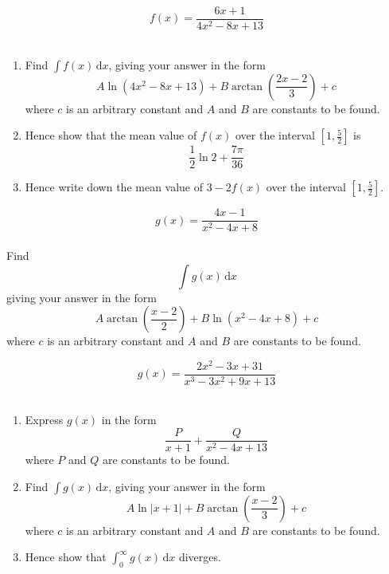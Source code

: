 \documentclass[leqno]{article}
\begin{document}
\begin{enumerate}[
  label=\textbf{\arabic*.},
  leftmargin=*,
  topsep=0pt,
  partopsep=0pt,
  parsep=0pt
]
\newpage

\questionitem

\[f(x)=\frac{6x+1}{4x^2-8x+13}\] \\

\begin{enumerate}[label=\textbf{(\alph*)}]
  \item Find $\int f(x)\,\mathrm{d}x$, giving your answer in the form \[A\ln(4x^2-8x+13)+B\arctan\left(\frac{2x-2}{3}\right)+c\] where $c$ is an arbitrary constant and $A$ and $B$ are constants to be found.  \\
  \item Hence show that the mean value of $f(x)$ over the interval $\left[1,\frac{5}{2}\right]$ is \[\frac{1}{2}\ln 2+\frac{7\pi}{36}\]  
  \item Hence write down the mean value of $3-2f(x)$ over the interval $\left[1,\frac{5}{2}\right]$.  \\
\end{enumerate}

\newpage

\questionitem

\[
g(x)=\frac{4x-1}{x^2-4x+8}
\] \\
Find
\[
\int g(x)\,\mathrm{d}x
\]
giving your answer in the form
\[
A\arctan\left(\frac{x-2}{2}\right)+B\ln(x^2-4x+8)+c
\]
where $c$ is an arbitrary constant and $A$ and $B$ are constants to be found.  \\
\newpage

\questionitem

\[
g(x)=\frac{2x^2-3x+31}{x^3-3x^2+9x+13}
\]
\\
\begin{enumerate}[label=\textbf{(\alph*)}]
  \item Express $g(x)$ in the form \[\frac{P}{x+1}+\frac{Q}{x^2-4x+13}\] where $P$ and $Q$ are constants to be found.  \\
  \item Find $\int g(x)\,\mathrm{d}x$, giving your answer in the form \[A\ln|x+1|+B\arctan\left(\frac{x-2}{3}\right)+c\] where $c$ is an arbitrary constant and $A$ and $B$ are constants to be found.  \\
  \item Hence show that $\int_0^\infty g(x)\,\mathrm{d}x$ diverges.  \\
\end{enumerate}


\end{enumerate}
\end{document}

